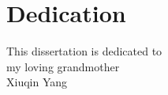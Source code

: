 \documentclass[12pt, letterpaper]{report}   %
\begin{document}


\maketitle

\copyrightpage

\approvalpage

\section*{Dedication}
\begin{flushright}
This dissertation is dedicated to \\
my loving grandmother \\ Xiuqin Yang 
\end{flushright}


\newpage
{}


\newpage
{}

\end{document}
